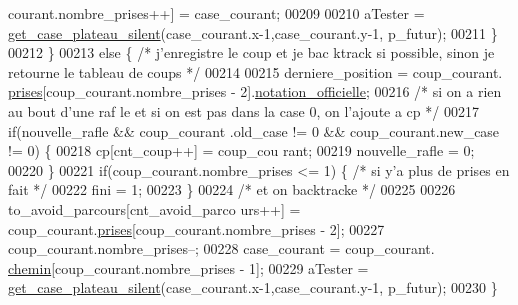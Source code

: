 \begin{DoxyCode}
      courant.nombre\_prises++] = case\_courant;
00209 
00210                                                         aTester = 
      \hyperlink{plateau_8h_a60a8f706865d0ae9087f8d65d4667655}{get_case_plateau_silent}(case\_courant.x-1,case\_courant.y-1, p\_futur);
00211                                                 \}
00212                                         \}
00213                                         \textcolor{keywordflow}{else} \{  \textcolor{comment}{/* j'enregistre le coup et je bac
      ktrack  si possible, sinon je retourne le tableau de coups */}
00214 
00215                                                 derniere\_position = coup\_courant.
      \hyperlink{structcoup_ae19b3a66d3f4e66b8f69a38e4005f44a}{prises}[coup\_courant.nombre\_prises - 2].\hyperlink{structcase__plateau_ad510581b324604a9cf685cbb769a421a}{notation_officielle};
00216                                                 \textcolor{comment}{/* si on a rien au bout d'une raf
      le et si on est pas dans la case 0, on l'ajoute a cp */}
00217                                                 \textcolor{keywordflow}{if}(nouvelle\_rafle && coup\_courant
      .old\_case != 0 && coup\_courant.new\_case != 0) \{
00218                                                         cp[cnt\_coup++] = coup\_cou
      rant;
00219                                                         nouvelle\_rafle = 0;
00220                                                 \}
00221                                                 \textcolor{keywordflow}{if}(coup\_courant.nombre\_prises <= 
      1) \{ \textcolor{comment}{/* si y'a plus de prises en fait */}
00222                                                         fini = 1;
00223                                                 \}
00224                                                 \textcolor{comment}{/* et on backtracke */}
00225 
00226                                                 to\_avoid\_parcours[cnt\_avoid\_parco
      urs++] = coup\_courant.\hyperlink{structcoup_ae19b3a66d3f4e66b8f69a38e4005f44a}{prises}[coup\_courant.nombre\_prises - 2];
00227                                                 coup\_courant.nombre\_prises--;
00228                                                 case\_courant = coup\_courant.
      \hyperlink{structcoup_aa66b88eb8140c2f459ac92fad0796510}{chemin}[coup\_courant.nombre\_prises - 1];
00229                                                 aTester = 
      \hyperlink{plateau_8h_a60a8f706865d0ae9087f8d65d4667655}{get_case_plateau_silent}(case\_courant.x-1,case\_courant.y-1, p\_futur);
00230                                         \}

\end{DoxyCode}
